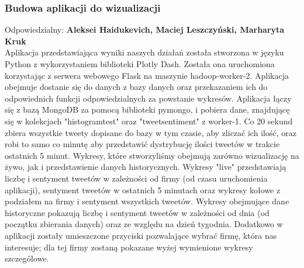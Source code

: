\documentclass[a4paper,11pt, notitlepage ]{article}
\begin{document}
    \subsubsection{Budowa aplikacji do wizualizacji}
    Odpowiedzialny: \textbf{Aleksei Haidukevich, Maciej Leszczyński, Marharyta Kruk}\\

    
    Aplikacja przedstawiająca wyniki naszych działań została stworzona w języku Python z wykorzystaniem biblioteki Plotly Dash. Została ona uruchomiona korzystając z serwera webowego Flask na maszynie hadoop-worker-2. Aplikacja obejmuje dostanie się do danych z bazy danych oraz przekazaniem ich do odpowiednich funkcji odpowiedzialnych za powstanie wykresów.
    \newline
    \newline
    Aplikacja łączy się z bazą MongoDB za pomocą biblioteki pymongo, i pobiera dane, znajdującę się w kolekcjach "histogramtest" oraz "tweetsentiment" z worker-1. Co 20 sekund zbiera wszystkie tweety dopisane do bazy w tym czasie, aby zliczać ich ilość, oraz robi to samo co minutę aby przedstawić dystrybucję ilości tweetów w trakcie ostatnich 5 minut.
    \newline
    \newline
    Wykresy, które stworzyliśmy obejmują zarówno wizualizację na żywo, jak i przedstawienie danych historycznych. Wykresy "live" przedstawiają liczbę i sentyment tweetów w zależności od firmy (od czasu uruchomienia aplikacji), sentyment tweetów w ostatnich 5 minutach oraz wykresy kołowe z podziałem na firmy i sentyment wszystkich tweetów. Wykresy obejmujące dane historyczne pokazują liczbę i sentyment tweetów w zależności od dnia (od początku zbierania danych) oraz ze względu na dzień tygodnia. Dodatkowo w aplikacji zostały umieszczone przyciski pozwalające wybrać firmę, która nas interesuje; dla tej firmy zostaną pokazane wyżej wymienione wykresy szczegółowe.
    
    
\end{document}
